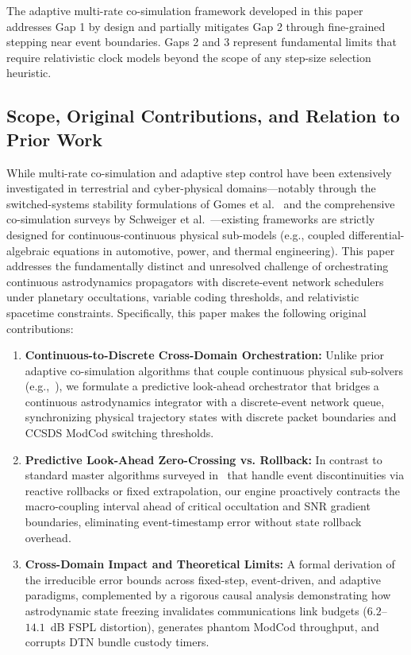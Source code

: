 \documentclass[a4paper,fleqn]{cas-sc}
\begin{document}
The adaptive multi-rate co-simulation framework developed in this paper addresses Gap 1 by design and partially mitigates Gap 2 through fine-grained stepping near event boundaries. Gaps 2 and 3 represent fundamental limits that require relativistic clock models beyond the scope of any step-size selection heuristic.

{\color{revcolor}\subsection{Scope, Original Contributions, and Relation to Prior Work}
While multi-rate co-simulation and adaptive step control have been extensively investigated in terrestrial and cyber-physical domains---notably through the switched-systems stability formulations of Gomes et al.~\cite{simpat_adaptive} and the comprehensive co-simulation surveys by Schweiger et al.~\cite{simpat_multirate}---existing frameworks are strictly designed for continuous-continuous physical sub-models (e.g., coupled differential-algebraic equations in automotive, power, and thermal engineering). This paper addresses the fundamentally distinct and unresolved challenge of orchestrating continuous astrodynamics propagators with discrete-event network schedulers under planetary occultations, variable coding thresholds, and relativistic spacetime constraints. Specifically, this paper makes the following original contributions:
\begin{enumerate}
    \item \textbf{Continuous-to-Discrete Cross-Domain Orchestration:} Unlike prior adaptive co-simulation algorithms that couple continuous physical sub-solvers (e.g.,~\cite{simpat_adaptive}), we formulate a predictive look-ahead orchestrator that bridges a continuous astrodynamics integrator with a discrete-event network queue, synchronizing physical trajectory states with discrete packet boundaries and CCSDS ModCod switching thresholds.
    \item \textbf{Predictive Look-Ahead Zero-Crossing vs. Rollback:} In contrast to standard master algorithms surveyed in~\cite{simpat_multirate} that handle event discontinuities via reactive rollbacks or fixed extrapolation, our engine proactively contracts the macro-coupling interval ahead of critical occultation and SNR gradient boundaries, eliminating event-timestamp error without state rollback overhead.
    \item \textbf{Cross-Domain Impact and Theoretical Limits:} A formal derivation of the irreducible error bounds across fixed-step, event-driven, and adaptive paradigms, complemented by a rigorous causal analysis demonstrating how astrodynamic state freezing invalidates communications link budgets ($6.2$--$14.1$~dB FSPL distortion), generates phantom ModCod throughput, and corrupts DTN bundle custody timers.

\end{enumerate}}
\end{document}
